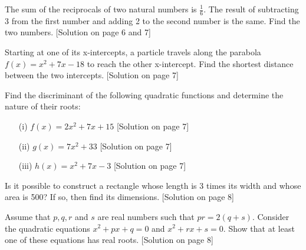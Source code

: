 \documentclass[addpoints, 12pt]{exam}
\theoremstyle{remark}
\begin{document}
\begin{questions}
\question The sum of the reciprocals of two natural numbers is $\frac{1}{6}$. The result of subtracting 3 from the first number and adding 2 to the second number is the same. Find the two numbers. [Solution on page 6 and 7]

\question Starting at one of its x-intercepts, a particle travels along the parabola $f(x) = x^2+7x-18$ to reach the other x-intercept. Find the shortest distance between the two intercepts. [Solution on page 7]

\question Find the discriminant of the following quadratic functions and determine the nature of their roots:
\begin{enumerate}
    \item[(i)] $f(x) = 2x^2 + 7x + 15$ [Solution on page 7]
    \item[(ii)] $g(x) = 7x^2 + 33$ [Solution on page 7]
    \item[(iii)] $h(x) = x^2 +7x - 3$ [Solution on page 7]
\end{enumerate}

\thispagestyle{plain}

\question Is it possible to construct a rectangle whose length is 3 times its width and whose area is 500? If so, then find its dimensions. [Solution on page 8]

\question Assume that $p, q, r$ and $s$ are real numbers such that $pr=2(q + s)$. Consider the quadratic equations $x^2 + px + q = 0$ and $x^2 + rx + s = 0$. Show that at least one of these equations has real roots. [Solution on page 8]
\end{questions}
\end{document}
